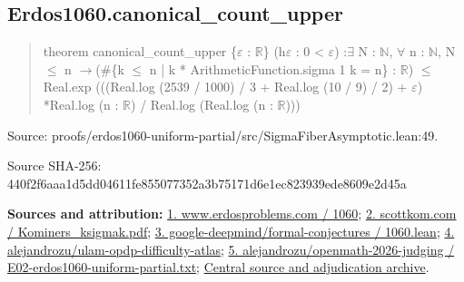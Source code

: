 \documentclass[11pt,a4paper]{article}
\begin{document}
\begin{samepage}
\subsection{Erdos1060.canonical\_count\_upper}
\begin{quote}\small\ttfamily theorem canonical\_count\_upper \{\ensuremath{\varepsilon} : \ensuremath{\mathbb{R}}\} (h\ensuremath{\varepsilon} : 0 < \ensuremath{\varepsilon}) :\newline     \ensuremath{\exists} N : \ensuremath{\mathbb{N}}, \ensuremath{\forall} n : \ensuremath{\mathbb{N}}, N \ensuremath{\leq} n \ensuremath{\to}\newline       (\#\{k \ensuremath{\leq} n | k * ArithmeticFunction.sigma 1 k = n\} : \ensuremath{\mathbb{R}}) \ensuremath{\leq}\newline         Real.exp (((Real.log (2539 / 1000) / 3 + Real.log (10 / 9) / 2) + \ensuremath{\varepsilon}) *\newline           Real.log (n : \ensuremath{\mathbb{R}}) / Real.log (Real.log (n : \ensuremath{\mathbb{R}})))\end{quote}
{\small Source: proofs/erdos1060-uniform-partial/src/SigmaFiberAsymptotic.lean:49.\par}

{\small Source SHA-256: 440f2f6aaa1d5dd04611fe855077352a3b75171d6e1ec823939ede8609e2d45a\par}

{\small\textbf{Sources and attribution:} \href{https://www.erdosproblems.com/1060}{1. www.erdosproblems.com / 1060}; \href{https://scottkom.com/assets/articles/Kominers_ksigmak.pdf}{2. scottkom.com / Kominers\_ksigmak.pdf}; \href{https://github.com/google-deepmind/formal-conjectures/blob/main/FormalConjectures/ErdosProblems/1060.lean}{3. google-deepmind/formal-conjectures / 1060.lean}; \href{https://github.com/alejandrozu/ulam-opdp-difficulty-atlas}{4. alejandrozu/ulam-opdp-difficulty-atlas}; \href{https://github.com/alejandrozu/openmath-2026-judging/blob/d0ed487f487fa7ec814ff705ab55249983fe8707/OpenMath-Judging/review/entries/E02-erdos1060-uniform-partial.txt}{5. alejandrozu/openmath-2026-judging / E02-erdos1060-uniform-partial.txt}; \href{https://github.com/alejandrozu/openmath-2026-judging}{Central source and adjudication archive}.\par}

\end{samepage}
\end{document}
